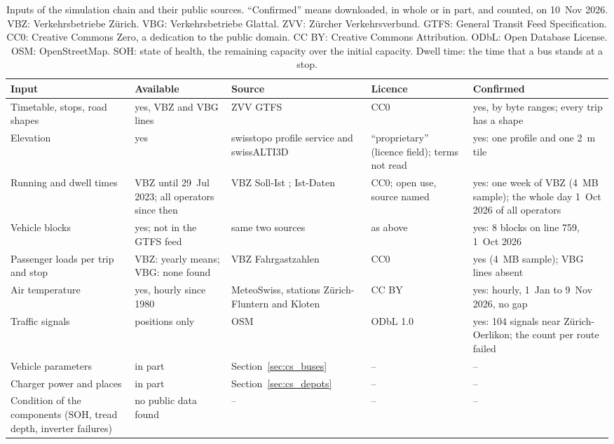 \documentclass[11pt,a4paper]{article}
\theoremstyle{plain}
\theoremstyle{definition}
\theoremstyle{remark}
\begin{document}
\begin{table}[htbp]
\centering
\caption{Inputs of the simulation chain and their public sources.
``Confirmed'' means downloaded, in whole or in part, and counted, on 10~Nov 2026.
VBZ: Verkehrsbetriebe Z\"urich. VBG: Verkehrsbetriebe Glattal. ZVV: Z\"urcher Verkehrsverbund. GTFS: General Transit Feed Specification.
CC0: Creative Commons Zero, a dedication to the public domain. CC BY: Creative Commons Attribution. ODbL: Open Database License.
OSM: OpenStreetMap. SOH: state of health, the remaining capacity over the initial capacity. Dwell time: the time that a bus stands at a stop.}
\label{tab:cs_sim_data}
\small
\setlength{\tabcolsep}{4pt}
\begin{tabularx}{\linewidth}{@{}>{\hsize=0.884\hsize\raggedright\arraybackslash}X>{\hsize=0.986\hsize\raggedright\arraybackslash}X>{\hsize=1.020\hsize\raggedright\arraybackslash}X>{\hsize=0.748\hsize\raggedright\arraybackslash}X>{\hsize=1.361\hsize\raggedright\arraybackslash}X@{}}
\toprule
\rowcolor{headgrey}
\textbf{Input} & \textbf{Available} & \textbf{Source} & \textbf{Licence} & \textbf{Confirmed} \\
\midrule
Timetable, stops, road shapes & yes, VBZ and VBG lines & ZVV GTFS \cite{ZVV2026GTFS} & CC0 & yes, by byte ranges; every trip has a shape \\
Elevation & yes & swisstopo profile service and swissALTI3D \cite{Swisstopo2026Profile} & ``proprietary'' (licence field); terms not read & yes: one profile and one 2~m tile \\
Running and dwell times & VBZ until 29~Jul 2023; all operators since then & VBZ Soll-Ist \cite{VBZSollIst2023}; Ist-Daten \cite{IstDaten2026} & CC0; open use, source named & yes: one week of VBZ (4~MB sample); the whole day 1~Oct 2026 of all operators \\
Vehicle blocks & yes; not in the GTFS feed & same two sources & as above & yes: 8 blocks on line 759, 1~Oct 2026 \\
Passenger loads per trip and stop & VBZ: yearly means; VBG: none found & VBZ Fahrgastzahlen \cite{VBZFahrgast2025} & CC0 & yes (4~MB sample); VBG lines absent \\
Air temperature & yes, hourly since 1980 & MeteoSwiss, stations Z\"urich-Fluntern and Kloten \cite{MeteoSwissSMN2026} & CC BY & yes: hourly, 1~Jan to 9~Nov 2026, no gap \\
Traffic signals & positions only & OSM \cite{OSMOverpass2026} & ODbL 1.0 & yes: 104 signals near Z\"urich-Oerlikon; the count per route failed \\
Vehicle parameters & in part & Section~\ref{sec:cs_buses} & -- & -- \\
Charger power and places & in part & Section~\ref{sec:cs_depots} & -- & -- \\
Condition of the components (SOH, tread depth, inverter failures) & no public data found & -- & -- & -- \\
\bottomrule
\end{tabularx}
\end{table}
\end{document}
